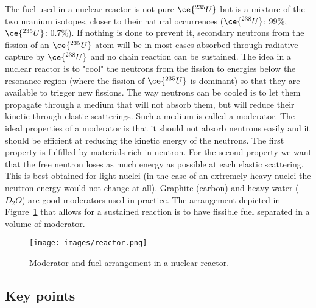\documentclass[12pt]{article}
\begin{document}
The fuel used in a nuclear reactor is not pure $\ce{^{235}U}$ but is a mixture of the two uranium isotopes, closer to their natural occurrences ($\ce{^{238}U}$: 99\%,$\ce{^{235}U}$: 0.7\%). If nothing is done to prevent it, secondary neutrons from the fission of an $\ce{^{235}U}$ atom will be in most cases absorbed through radiative capture by $\ce{^{238}U}$ and no chain reaction can be sustained. The idea in a nuclear reactor is to "cool" the neutrons from the fission to energies below the resonance region (where the fission of $\ce{^{235}U}$ is dominant) so that they are available to trigger new fissions. The way neutrons can be cooled is to let them propagate through a medium that will not absorb them, but will reduce their kinetic through elastic scatterings. Such a medium is called a moderator. The ideal properties of a moderator is that it should not absorb neutrons easily and it should be efficient at reducing the kinetic energy of the neutrons. The first property is fulfilled by materials rich in neutron. For the second property we want that the free neutron loses as much energy as possible at each elastic scattering. This is best obtained for light nuclei (in the case of an extremely heavy nuclei the neutron energy would not change at all). Graphite (carbon) and heavy water ($D_2O$) are good moderators used in practice. The arrangement depicted in Figure~\ref{fig:reactor} that allows for a sustained reaction is to have fissible fuel separated in a volume of moderator.       
\begin{figure}
\begin{center}
\texttt{[image: images/reactor.png]}   
\end{center}
\caption{Moderator and fuel arrangement in a nuclear reactor.}\label{fig:reactor}
\end{figure} 
\clearpage
%
\subsection{Key points}\begin{itemize}
  
\end{itemize}
\end{document}
